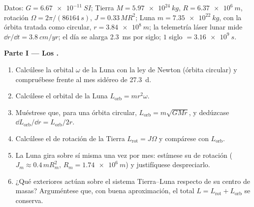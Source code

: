 \begin{problem}
\label{pb:b1:angular-momentum:1}
Datos: $G = \qty{6.67e-11}{SI}$; Tierra $M = \qty{5.97e24}{kg}$, $R =
\qty{6.37e6}{m}$, rotación $\Omega = 2\pi/(\qty{86164}{s})$,  $J = 0.33\,MR^2$; Luna $m = \qty{7.35e22}{kg}$, con la órbita
tratada como circular, $r = \qty{3.84e8}{m}$; la telemetría láser lunar
mide $\dd r/\dd t = \qty{3.8}{cm/yr}$; el día se alarga \qty{2.3}{ms} por
siglo; $1$ siglo $= \qty{3.16e9}{s}$.

\medskip
\noindent\textbf{Parte I --- Los .}
\begin{enumerate}
  \item Calcúlese la  orbital $\omega$ de la Luna con la
        ley de Newton (órbita circular) y compruébese frente al mes
        sidéreo de \qty{27.3}{d}.
  \item Calcúlese el  orbital de la Luna $L_{\text{orb}} =
        mr^2\omega$.
  \item Muéstrese que, para una órbita circular, $L_{\text{orb}} = m\sqrt{GMr}$,
        y dedúzcase $\dd L_{\text{orb}}/\dd r = L_{\text{orb}}/2r$.
  \item Calcúlese el  de rotación de la Tierra $L_{\text{rot}} =
        J\Omega$ y compárese con $L_{\text{orb}}$.
  \item La Luna gira sobre sí misma una vez por mes: estímese su  de rotación ($J_m \approx 0.4\,mR_m^2$, $R_m = \qty{1.74e6}{m}$)
        y justifíquese despreciarlo.
  \item ¿Qué  exteriores actúan sobre el sistema Tierra--Luna
        respecto de su centro de masas? Arguméntese que, con buena
        aproximación, el total $L = L_{\text{rot}} + L_{\text{orb}}$ se conserva.
\end{enumerate}


\end{problem}
